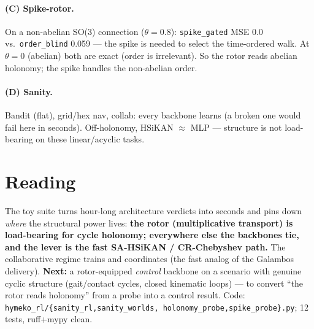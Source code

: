 \documentclass[11pt]{article}
\begin{document}
\paragraph{(C) Spike-rotor.} On a non-abelian SO(3) connection ($\theta{=}0.8$): \texttt{spike\_gated} MSE 0.0 vs.\
\texttt{order\_blind} 0.059 --- the spike is needed to select the time-ordered walk. At $\theta{=}0$ (abelian) both
are exact (order is irrelevant). So the rotor reads abelian holonomy; the spike handles the non-abelian order.

\paragraph{(D) Sanity.} Bandit (flat), grid/hex nav, collab: every backbone learns (a broken one would fail here
in seconds). Off-holonomy, HSiKAN $\approx$ MLP --- structure is not load-bearing on these linear/acyclic tasks.

\section{Reading}
The toy suite turns hour-long architecture verdicts into seconds and pins down \emph{where} the structural power
lives: \textbf{the rotor (multiplicative transport) is load-bearing for cycle holonomy; everywhere else the
backbones tie, and the lever is the fast SA-HSiKAN / CR-Chebyshev path.} The collaborative regime trains and
coordinates (the fast analog of the Galambos delivery). \textbf{Next:} a rotor-equipped \emph{control} backbone on
a scenario with genuine cyclic structure (gait/contact cycles, closed kinematic loops) --- to convert ``the rotor
reads holonomy'' from a probe into a control result. Code: \texttt{hymeko\_rl/\{sanity\_rl,sanity\_worlds,
holonomy\_probe,spike\_probe\}.py}; 12 tests, ruff+mypy clean.
\end{document}
